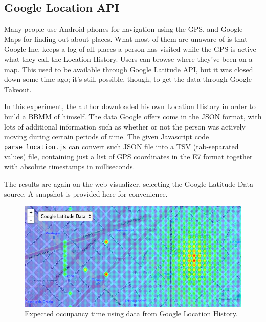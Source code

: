 \documentclass[12pt]{article}
\begin{document}
\subsection{Google Location API}

Many people use Android phones for navigation using the GPS, and Google Maps for finding out about places. What most of them are unaware of is that Google Inc. keeps a log of all places a person has visited while the GPS is active - what they call the Location History. Users can browse where they've been on a map. This used to be available through Google Latitude API, but it was closed down some time ago; it's still possible, though, to get the data through Google Takeout.

In this experiment, the author downloaded his own Location History in order to build a BBMM of himself. The data Google offers coms in the JSON format, with lots of additional information such as whether or not the person was actively moving during certain periods of time. The given Javascript code \texttt{parse\_location.js} can convert such JSON file into a TSV (tab-separated values) file, containing just a list of GPS coordinates in the E7 format together with absolute timestamps in milliseconds.

The results are again on the web visualizer, selecting the Google Latitude Data source. A snapshot is provided here for convenience.

\begin{figure}[H]
    \centering
    \includegraphics[width=\textwidth]{plots/google_sample.png}
    \caption{Expected occupancy time using data from Google Location History.}
    \label{fig:google_sample}
\end{figure}

\end{document}

